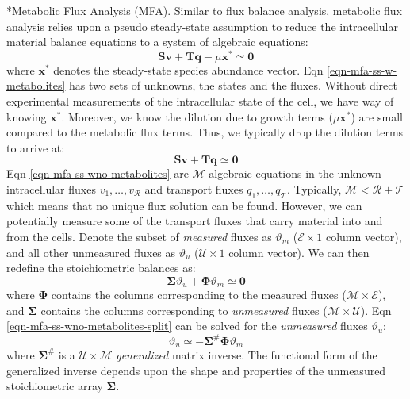 \documentclass[11pt]{article}
\makeatletter
\theoremstyle{definition}
\renewcommand\subsection{\@startsection
	{subsection}{2}{0mm}
	{-0.05in}
	{-0.5\baselineskip}
	{\normalfont\normalsize\bfseries}}
\makeatother
\begin{document}
\subsection*{Metabolic Flux Analysis (MFA).}
Similar to flux balance analysis, metabolic flux analysis relies upon a pseudo steady-state assumption to reduce the intracellular material balance equations to a system of algebraic equations:
\begin{equation}\label{eqn-mfa-ss-w-metabolites}
	\mathbf{S}\mathbf{v} + \mathbf{T}\mathbf{q} -\mu\mathbf{x}^{*}\simeq\mathbf{0}
\end{equation}where $\mathbf{x}^{*}$ denotes the steady-state species abundance vector.
Eqn \eqref{eqn-mfa-ss-w-metabolites} has two sets of unknowns, the states and the fluxes.
Without direct experimental measurements of the intracellular state of the cell, we have way of knowing $\mathbf{x}^{*}$.
Moreover, we know the dilution due to growth terms ($\mu\mathbf{x}^{*}$) are small compared to the metabolic flux terms.
Thus, we typically drop the dilution terms to arrive at:
\begin{equation}\label{eqn-mfa-ss-wno-metabolites}
	\mathbf{S}\mathbf{v} + \mathbf{T}\mathbf{q} \simeq\mathbf{0}
\end{equation}Eqn \eqref{eqn-mfa-ss-wno-metabolites} are $\mathcal{M}$ algebraic equations in the unknown intracellular fluxes $v_{1},\hdots,v_{\mathcal{R}}$ and transport fluxes
$q_{1},\hdots,q_{\mathcal{T}}$. Typically, $\mathcal{M}<\mathcal{R}+\mathcal{T}$ which means that no unique flux solution can be found.
However, we can potentially measure some of the transport fluxes that carry material into and from the cells. Denote the subset of \emph{measured} fluxes
as $\vartheta_{m}$ ($\mathcal{E}\times{1}$ column vector), and all other unmeasured fluxes as $\vartheta_{u}$ ($\mathcal{U}\times{1}$ column vector).
We can then redefine the stoichiometric balances as:
\begin{equation}\label{eqn-mfa-ss-wno-metabolites-split}
	\mathbf{\Sigma}\vartheta_{u} + \mathbf{\Phi}\vartheta_{m} \simeq\mathbf{0}
\end{equation}where $\mathbf{\Phi}$ contains the columns corresponding to the measured fluxes ($\mathcal{M}\times\mathcal{E}$), and $\mathbf{\Sigma}$ contains
the columns corresponding to \emph{unmeasured} fluxes ($\mathcal{M}\times\mathcal{U}$).
Eqn \eqref{eqn-mfa-ss-wno-metabolites-split} can be solved for the \emph{unmeasured} fluxes $\vartheta_{u}$:
\begin{equation}
	\vartheta_{u}\simeq-\mathbf{\Sigma}^{\#}\mathbf{\Phi}\vartheta_{m}
\end{equation}where $\mathbf{\Sigma}^{\#}$ is a $\mathcal{U}\times\mathcal{M}$ \emph{generalized} matrix inverse.
The functional form of the generalized inverse depends upon the shape and properties of the unmeasured stoichiometric array $\mathbf{\Sigma}$.
\end{document}
